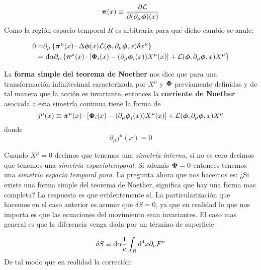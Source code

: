 \begin{equation}
	\boldsymbol{\pi} (x)  \equiv \frac{\partial \mathcal{L}}{\partial (\partial_\mu \boldsymbol{\phi})(x)} \label{Ec:02-02-10}
\end{equation}
Como la región espacio-temporal $R$ es arbitraria para que dicho cambio se anule:

\begin{equation}
	\begin{split}
		0 = &   \partial_\mu \left\lbrace \boldsymbol{\pi}^\mu (x) \cdot \Delta \boldsymbol{\phi} (x)  \mathcal{L} (\boldsymbol{\phi},\partial_\mu \boldsymbol{\phi},x) \delta x^\mu \right\rbrace \\
		= & \ \mathrm{d} \alpha \partial_\mu \left\lbrace \boldsymbol{\pi}^\mu (x) \cdot \left[  \boldsymbol{\Phi}_i (x) - (\partial_\mu \boldsymbol{\phi}_i (x))X^\mu(x) \right] +\mathcal{L} (\boldsymbol{\phi},\partial_\mu \boldsymbol{\phi},x)  X^\mu \right\rbrace
	\end{split}
\end{equation}
\begin{teorema}
	La \textbf{forma simple del teorema de Noether} nos dice que para una transformación infinitesimal caracterizada por $X^\mu$ y $\boldsymbol{\Phi}$ previamente definidas y de tal manera que la acción es invariante, entonces la \textbf{corriente de Noether} asociada a esta simetría continua tiene la forma de 
	\begin{equation}
		j^\mu (x)\equiv \boldsymbol{\pi}^\mu (x) \cdot \left[  \boldsymbol{\Phi}_i (x) - (\partial_\mu \boldsymbol{\phi}_i (x))X^\mu(x) \right]+ \mathcal{L} (\boldsymbol{\phi},\partial_\mu \boldsymbol{\phi},x)  X^\mu
	\end{equation}
	donde 
	\begin{equation}
		\partial_\mu j^\mu (x) = 0 
	\end{equation} 
\end{teorema}
Cuando $X^\mu=0$ decimos que tenemos una \textit{simetría interna}, si no es cero decimos que tenemos una \textit{simetría espaciotemporal}. Si además $\boldsymbol{\Phi}=0$ entonces tenemos una \textit{simetría espacio temporal pura}. La pregunta ahora que nos hacemos es: ¿Si existe una forma simple del teorema de Noether, significa que hay una forma mas completa? La respuesta es que evidentemente sí. La particularización que hacemos en el caso anterior es asumir que $\delta S=0$, ya que en realidad lo que nos importa es que las ecuaciones del movimiento sean invariantes. El caso mas general es que la diferencia venga dada por un término de superficie

\begin{equation}
	\delta S \equiv \mathrm{d} \alpha \frac{1}{c} \int_R\mathrm{d}^4 x \partial_\nu F^\nu
\end{equation}
De tal modo que en realidad la correción:

